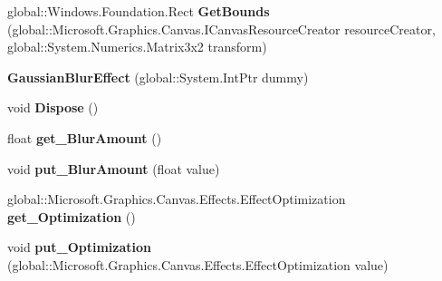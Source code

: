 \begin{DoxyCompactItemize}
global\+::\+Windows.\+Foundation.\+Rect {\bfseries Get\+Bounds} (global\+::\+Microsoft.\+Graphics.\+Canvas.\+I\+Canvas\+Resource\+Creator resource\+Creator, global\+::\+System.\+Numerics.\+Matrix3x2 transform)
\item 
\mbox{\label{class_microsoft_1_1_graphics_1_1_canvas_1_1_effects_1_1_gaussian_blur_effect_a001441f34b40b123ff0a4f6c0fa5adbb}} 
{\bfseries Gaussian\+Blur\+Effect} (global\+::\+System.\+Int\+Ptr dummy)
\item 
\mbox{\label{class_microsoft_1_1_graphics_1_1_canvas_1_1_effects_1_1_gaussian_blur_effect_a9cea4f6122394e148cdf4a3eb0624aa4}} 
void {\bfseries Dispose} ()
\item 
\mbox{\label{class_microsoft_1_1_graphics_1_1_canvas_1_1_effects_1_1_gaussian_blur_effect_a7b01eda1ee6f9bb08a3c9086d7ef1edb}} 
float {\bfseries get\+\_\+\+Blur\+Amount} ()
\item 
\mbox{\label{class_microsoft_1_1_graphics_1_1_canvas_1_1_effects_1_1_gaussian_blur_effect_a1dcdfb69af9895c2333497a0d1b4edde}} 
void {\bfseries put\+\_\+\+Blur\+Amount} (float value)
\item 
\mbox{\label{class_microsoft_1_1_graphics_1_1_canvas_1_1_effects_1_1_gaussian_blur_effect_aef6c39bc362d054ffa0e6349d24f02cd}} 
global\+::\+Microsoft.\+Graphics.\+Canvas.\+Effects.\+Effect\+Optimization {\bfseries get\+\_\+\+Optimization} ()
\item 
\mbox{\label{class_microsoft_1_1_graphics_1_1_canvas_1_1_effects_1_1_gaussian_blur_effect_af7fd358991e46db4322e11d372de3181}} 
void {\bfseries put\+\_\+\+Optimization} (global\+::\+Microsoft.\+Graphics.\+Canvas.\+Effects.\+Effect\+Optimization value)
\item 
\mbox{\label{class_microsoft_1_1_graphics_1_1_canvas_1_1_effects_1_1_gaussian_blur_effect_a1fe5f86a30992bc3bf2477a872efde7a}} 

\end{DoxyCompactItemize}
